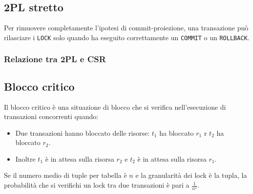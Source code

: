 \documentclass[oneside,a4paper,11pt]{book}
\theoremstyle{italicstyle}
\theoremstyle{normStyle}
\begin{document}
\subsection{2PL stretto}
Per rimuovere completamente l'ipotesi di commit-proiezione, una transazione può rilasciare i \verb|LOCK| 
solo quando ha eseguito correttamente un \verb|COMMIT| o 
un \verb|ROLLBACK|.
\begin{figure}[H]
  \centering
\end{figure}
\subsubsection{Relazione tra 2PL e CSR}
\begin{figure}[H]
  \centering
\end{figure}
\subsection{Blocco critico}
Il blocco critico è una situazione di blocco che si verifica nell'esecuzione di 
transazioni concorrenti quando:
\begin{itemize}
  \item Due transazioni hanno bloccato delle risorse: $t_1$ ha bloccato $r_1$ 
  r $t_2$ ha bloccato $r_2$.
  \item Inoltre $t_1$ è in attesa sulla risorsa $r_2$ e $t_2$ è in attesa sulla risorsa $r_1$.
\end{itemize}
Se il numero medio di tuple per tabella è $n$ e la granularità dei lock è la tupla,
la probabilità che si verifichi un lock tra due transazioni è pari a $\frac{1}{n^2}$.
\end{document}
